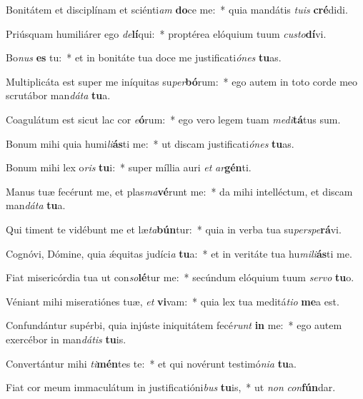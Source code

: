 \item Bonitátem et disciplínam et sciénti\textit{am} \textbf{do}ce me:~* quia mandátis \textit{tu}\textit{is} \textbf{cré}didi.
\item Priúsquam humiliárer ego \textit{de}\textbf{lí}qui:~* proptérea elóquium tuum \textit{cus}\textit{to}\textbf{dí}vi.
\item Bo\textit{nus} \textbf{es} tu:~* et in bonitáte tua doce me justificati\textit{ó}\textit{nes} \textbf{tu}as.
\item Multiplicáta est super me iníquitas su\textit{per}\textbf{bó}rum:~* ego autem in toto corde meo scrutábor man\textit{dá}\textit{ta} \textbf{tu}a.
\item Coagulátum est sicut lac cor \textit{e}\textbf{ó}rum:~* ego vero legem tuam \textit{me}\textit{di}\textbf{tá}tus sum.
\item Bonum mihi quia humi\textit{li}\textbf{ás}ti me:~* ut discam justificati\textit{ó}\textit{nes} \textbf{tu}as.
\item Bonum mihi lex o\textit{ris} \textbf{tu}i:~* super míllia auri \textit{et} \textit{ar}\textbf{gén}ti.
\item Manus tuæ fecérunt me, et plas\textit{ma}\textbf{vé}runt me:~* da mihi intelléctum, et discam man\textit{dá}\textit{ta} \textbf{tu}a.
\item Qui timent te vidébunt me et læ\textit{ta}\textbf{bún}tur:~* quia in verba tua su\textit{per}\textit{spe}\textbf{rá}vi.
\item Cognóvi, Dómine, quia ǽquitas judíci\textit{a} \textbf{tu}a:~* et in veritáte tua hu\textit{mi}\textit{li}\textbf{ás}ti me.
\item Fiat misericórdia tua ut con\textit{so}\textbf{lé}tur me:~* secúndum elóquium tuum \textit{ser}\textit{vo} \textbf{tu}o.
\item Véniant mihi miseratiónes tuæ, \textit{et} \textbf{vi}vam:~* quia lex tua meditá\textit{ti}\textit{o} \textbf{me}a est.
\item Confundántur supérbi, quia injúste iniquitátem fecé\textit{runt} \textbf{in} me:~* ego autem exercébor in man\textit{dá}\textit{tis} \textbf{tu}is.
\item Convertántur mihi \textit{ti}\textbf{mén}tes te:~* et qui novérunt testimó\textit{ni}\textit{a} \textbf{tu}a.
\item Fiat cor meum immaculátum in justificatióni\textit{bus} \textbf{tu}is,~* ut \textit{non} \textit{con}\textbf{fún}dar.
